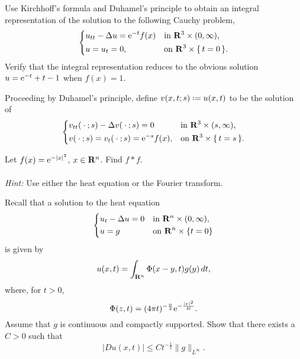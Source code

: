 \begin{problem}
  Use Kirchhoff's formula and Duhamel's principle to obtain an integral
  representation of the solution to the following Cauchy problem,
  \[
    \left\{
      \begin{aligned}
        &u_{tt}-\Delta u=\mathrm{e}^{-t}f(x)&&\text{in \(\mathbf{R}^3\times(0,\infty)\),}\\
        &u=u_t=0,&&\text{on \(\mathbf{R}^3\times\{\,t=0\,\}\).}
      \end{aligned}
    \right.
  \]
  Verify that the integral representation reduces to the obvious solution
  \(u=\mathrm{e}^{-t}+t-1\) when \(f(x)=1\).
\end{problem}
\begin{solution*}
  Proceeding by Duhamel's principle, define \(v(x,t;s)\defeq u(x,t)\) to be
  the solution of
  \[
    \left\{
      \begin{aligned}
        &v_{tt}(\blank;s)-\Lap v(\blank;s)=0%
        &&\text{in \(\R^3\times(s,\infty)\),}\\
        &v(\blank;s)=v_t(\blank;s)=\rme^{-s}f(x),%
        &&\text{on \(\R^3\times\{\,t=s\,\}\).}
      \end{aligned}
    \right.
  \]
\end{solution*}

\begin{problem}
  Let \(f(x)=\mathrm{e}^{-|x|^2}\), \(x\in\mathbf{R}^n\). Find \(f*f\).
  \\\\
  \emph{Hint:} Use either the heat equation or the Fourier transform.
\end{problem}
\begin{solution*}
\end{solution*}

\begin{problem}
  Recall that a solution to the heat equation
  \[
    \left\{
      \begin{aligned}
        &u_t-\Delta u=0&&\text{in \(\mathbf{R}^n\times(0,\infty)\),}\\
        &u=g&&\text{on \(\mathbf{R}^n\times\{t=0\}\)}
      \end{aligned}
    \right.
  \]
  is given by
  \[
    u(x,t)=\int_{\mathbf{R}^n}\Phi(x-y,t)g(y)\mathop{}\!d t,
  \]
  where, for \(t>0\),
  \[
    \Phi(z,t)=(4\pi t)^{-\frac{n}{2}}\mathrm{e}^{-\frac{|x|^2}{4t}}.
  \]
  Assume that \(g\) is continuous and compactly supported. Show that there
  exists a \(C>0\) such that
  \[
    |D u(x,t)|\leq Ct^{-\frac{1}{2}}\|g\|_{L^\infty}.
  \]
\end{problem}
\begin{solution*}
\end{solution*}

